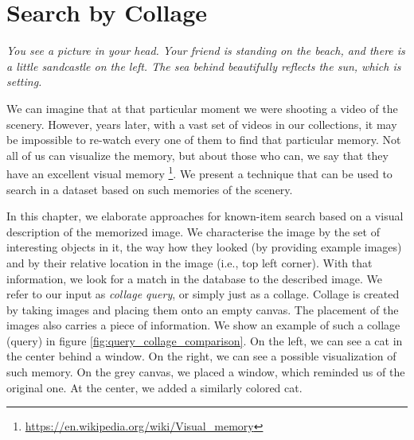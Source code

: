 \chapter{Search by Collage}
\label{ch:object_location}


\normalem
\emph{You see a picture in your head. Your friend is standing on the beach, and there is a little sandcastle on the left. The sea behind beautifully reflects the sun, which is setting.}
\ULforem

We can imagine that at that particular moment we were shooting a video of the scenery. However, years later, with a vast set of videos in our collections, it may be impossible to re-watch every one of them to find that particular memory. Not all of us can visualize the memory, but about those who can, we say that they have an excellent visual memory \footnote{\url{https://en.wikipedia.org/wiki/Visual_memory}}. We present a technique that can be used to search in a dataset based on such memories of the scenery.

In this chapter, we elaborate approaches for known-item search based on a visual description of the memorized image. We characterise the image by the set of interesting objects in it, the way how they looked (by providing example images) and by their relative location in the image (i.e., top left corner). With that information, we look for a match in the database to the described image. We refer to our input as \emph{collage query}, or simply just as a collage. Collage is created by taking images and placing them onto an empty canvas. The placement of the images also carries a piece of information. We show an example of such a collage (query) in figure \ref{fig:query_collage_comparison}. On the left, we can see a cat in the center behind a window. On the right, we can see a possible visualization of such memory. On the grey canvas, we placed a window, which reminded us of the original one. At the center, we added a similarly colored cat.

